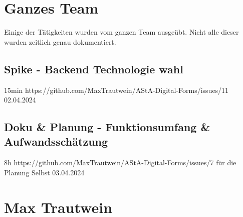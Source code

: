 \section{Ganzes Team}
Einige der Tätigkeiten wurden vom ganzen Team ausgeübt.
Nicht alle dieser wurden zeitlich genau dokumentiert.

\subsection{\Gls{Spike} - Backend Technologie wahl }
15min
https://github.com/MaxTrautwein/AStA-Digital-Forms/issues/11
02.04.2024

\subsection{Doku & Planung - Funktionsumfang & Aufwandsschätzung}
8h
https://github.com/MaxTrautwein/AStA-Digital-Forms/issues/7
für die Planung Selbst
03.04.2024

\section{Max Trautwein}\label{sec:max-trautwein}


